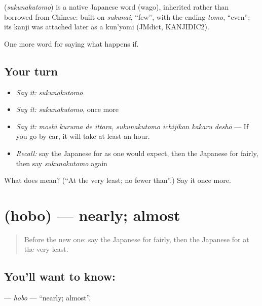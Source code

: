\begin{cousinweb}
\textbf{} (\emph{sukunakutomo}) is a native Japanese word (wago), inherited rather than borrowed from Chinese: built on \emph{sukunai}, \textquotedblleft{}few\textquotedblright{}, with the ending \emph{tomo}, \textquotedblleft{}even\textquotedblright{}; its kanji was attached later as a kun'yomi (JMdict, KANJIDIC2).
\end{cousinweb}

\begin{grammarlens}[title={What you've built}]
One more word for saying what happens if.
\end{grammarlens}

\subsection*{Your turn}
\begin{itemize}
\raggedright
  \item \emph{Say it:} \emph{sukunakutomo}
  \item \emph{Say it:} \emph{sukunakutomo}, once more
  \item \emph{Say it:} \emph{moshi kuruma de ittara, sukunakutomo ichijikan kakaru deshō} — If you go by car, it will take at least an hour.
  \item \emph{Recall:} say the Japanese for as one would expect, then the Japanese for fairly, then say \emph{sukunakutomo} again
\end{itemize}

\begin{tcolorbox}[breakable,colback=teal!4,colframe=teal!35!black,title={Before you move on}]
What does  mean? (\textquotedblleft{}At the very least; no fewer than\textquotedblright{}.) Say it once more.
\end{tcolorbox}
\section[\texorpdfstring{\ja{ほぼ} (hobo)}{ほぼ (hobo)}]{ (hobo) — nearly; almost}

\label{lesson:JA-C530-hobo}



\begin{quote}
Before the new one: say the Japanese for fairly, then the Japanese for at the very least.
\end{quote}

\subsection*{You'll want to know: }
\textbf{} — \emph{hobo} — \textquotedblleft{}nearly; almost\textquotedblright{}.

